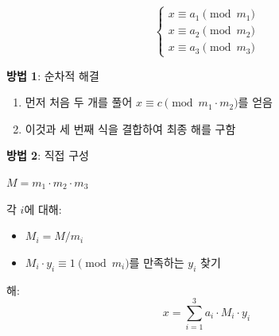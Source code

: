 \documentclass[11pt,a4paper]{article}
\theoremstyle{definition}
\theoremstyle{remark}
\begin{document}
\[\begin{cases}
x \equiv a_1 \pmod{m_1} \\
x \equiv a_2 \pmod{m_2} \\
x \equiv a_3 \pmod{m_3}
\end{cases}\]

\textbf{방법 1}: 순차적 해결
\begin{enumerate}
    \item 먼저 처음 두 개를 풀어 $x \equiv c \pmod{m_1 \cdot m_2}$를 얻음
    \item 이것과 세 번째 식을 결합하여 최종 해를 구함
\end{enumerate}

\textbf{방법 2}: 직접 구성

$M = m_1 \cdot m_2 \cdot m_3$

각 $i$에 대해:
\begin{itemize}
    \item $M_i = M / m_i$
    \item $M_i \cdot y_i \equiv 1 \pmod{m_i}$를 만족하는 $y_i$ 찾기
\end{itemize}

해:
\[x = \sum_{i=1}^{3} a_i \cdot M_i \cdot y_i\]
\end{document}
